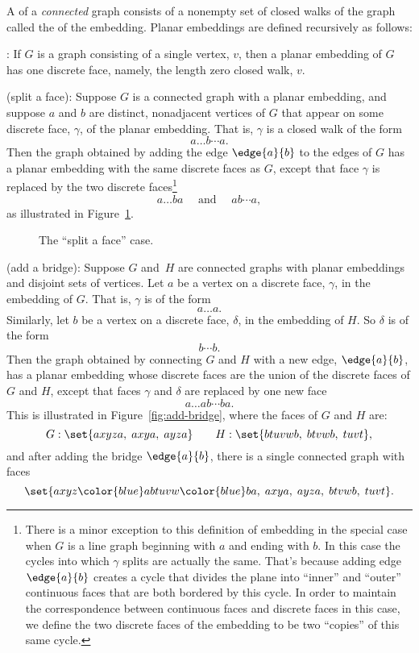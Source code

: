 \begin{definition}\label{def:embedding}\label{embeddingdef}
A  of a \emph{connected} graph consists of a
nonempty set of closed walks of the graph called the  of the embedding.  Planar embeddings are defined recursively
as follows:

: If $G$ is a graph consisting of a single
vertex, $v$, then a planar embedding of $G$ has one discrete face,
namely, the length zero closed walk, $v$.

 (split a face): Suppose $G$ is a
connected graph with a planar embedding, and suppose $a$ and $b$ are
distinct, nonadjacent vertices of $G$ that appear on some discrete
face, $\gamma$, of the planar embedding.  That is, $\gamma$ is a
closed walk of the form
\[
a \dots b \cdots a.
\]
Then the graph obtained by adding the edge $\edge{a}{b}$ to the edges of
$G$ has a planar embedding with the same discrete faces as $G$, except
that face $\gamma$ is replaced by the two discrete
faces\footnote{\label{C} There is a minor exception to this definition of
  embedding in the special case when $G$ is a line graph beginning with
  $a$ and ending with $b$.  In this case the cycles into which $\gamma$
  splits are actually the same.  That's because adding edge $\edge{a}{b}$
  creates a cycle that divides the plane into ``inner'' and ``outer''
  continuous faces that are both bordered by this cycle.  In order to
  maintain the correspondence between continuous faces and discrete faces
  in this case, we define the two discrete faces of the embedding to be
  two ``copies'' of this same cycle.}
\[
a\dots ba\quad \text{ and } \quad ab\cdots a,
\]
as illustrated in Figure~\ref{fig:face-splitting}.

\begin{figure}


\caption{The ``split a face'' case.}
\label{fig:face-splitting}
\end{figure}

 (add a bridge): Suppose $G$ and~$H$
are connected graphs with planar embeddings and disjoint sets of
vertices.  Let $a$ be a vertex on a discrete face, $\gamma$, in the
embedding of $G$.  That is, $\gamma$ is of the form
\[
a\dots a.
\]
Similarly, let $b$ be a vertex on a discrete face, $\delta$, in the
embedding of $H$.  So $\delta$ is of the form
\[
b\cdots b.
\]
Then the graph obtained by connecting $G$ and $H$ with a new edge,
$\edge{a}{b}$, has a planar embedding whose discrete faces are the union of
the discrete faces of $G$ and $H$, except that faces $\gamma$ and $\delta$
are replaced by one new face
\[
a\dots ab\cdots ba.
\]
This is illustrated in Figure~\ref{fig:add-bridge}, where the faces of
$G$ and $H$ are:
\[
G: \set{ axyza,\; axya,\; ayza }
    \qquad H: \set{ btuvwb,\; btvwb,\; tuvt },
\]
and after adding the bridge $\edge{a}{b}$, there is a
single connected graph with faces
\[
\set{ axyz{\color{blue}ab}tuvw{\color{blue}ba},\;
         axya,\; ayza,\; btvwb,\; tuvt }.
\]


\end{definition}
